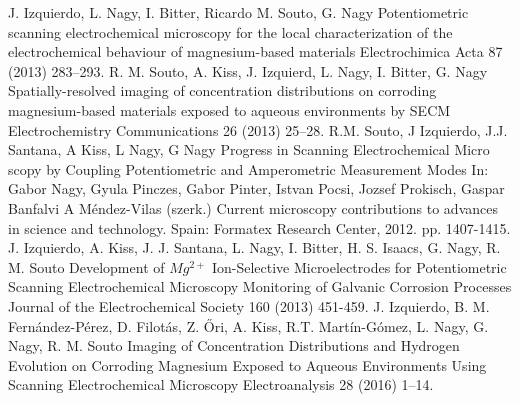 \documentclass[3p]{elsarticle}
\begin{document}
\begin{thebibliography}{5}
J. Izquierdo, L. Nagy, I. Bitter, Ricardo M. Souto, G. Nagy 
Potentiometric scanning electrochemical microscopy for the local characterization of the electrochemical behaviour of magnesium-based materials Electrochimica Acta 87 (2013) 283–293.
R. M. Souto, A. Kiss, J. Izquierd, L. Nagy, I. Bitter, G. Nagy Spatially-resolved imaging of concentration distributions on corroding magnesium-based materials exposed to aqueous environments by SECM Electrochemistry Communications 26 (2013) 25–28.
R.M. Souto, J Izquierdo, J.J. Santana, A Kiss, L Nagy, G Nagy 
Progress in Scanning Electrochemical Micro scopy by Coupling Potentiometric and Amperometric Measurement Modes
In: Gabor Nagy, Gyula Pinczes, Gabor Pinter, Istvan Pocsi, Jozsef Prokisch, Gaspar Banfalvi
A Méndez-Vilas (szerk.)
Current microscopy contributions to advances in science and technology. Spain: Formatex Research Center, 2012. pp. 1407-1415.
J. Izquierdo, A. Kiss, J. J. Santana, L. Nagy, I. Bitter, H. S. Isaacs, G. Nagy, R. M. Souto
Development of $Mg^{2+}$ Ion-Selective Microelectrodes for Potentiometric Scanning Electrochemical Microscopy Monitoring of Galvanic Corrosion Processes
Journal of the Electrochemical Society  160 (2013) 451-459. 
J. Izquierdo, B. M. Fernández-Pérez, D. Filotás, Z. Őri, A. Kiss, R.T. Martín-Gómez, L. Nagy, G. Nagy, R. M. Souto Imaging of Concentration Distributions and Hydrogen Evolution on Corroding Magnesium Exposed to Aqueous Environments Using Scanning Electrochemical Microscopy Electroanalysis 28 (2016) 1–14.

\end{thebibliography}
\end{document}
